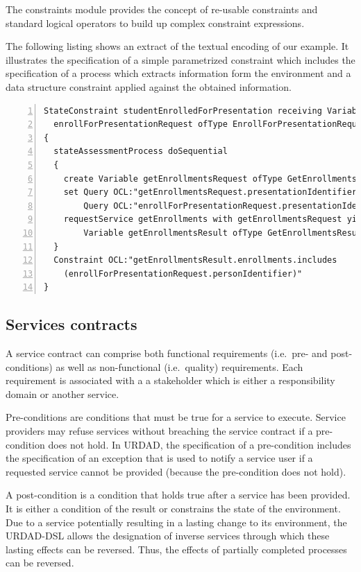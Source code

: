 The constraints module provides the concept of re-usable constraints and standard logical operators to build up complex constraint expressions.

The following listing shows an extract of the textual encoding of our example. It illustrates the specification of a simple parametrized  constraint which includes the specification of a process which extracts information form the environment and a data structure constraint applied against the obtained information.
\tiny \begin{lstlisting}[numbers=left,escapechar=|]
StateConstraint studentEnrolledForPresentation receiving Variable 
  enrollForPresentationRequest ofType EnrollForPresentationRequest
{
  stateAssessmentProcess doSequential
  {
    create Variable getEnrollmentsRequest ofType GetEnrollmentsRequest
    set Query OCL:"getEnrollmentsRequest.presentationIdentifier" equalTo
        Query OCL:"enrollForPresentationRequest.presentationIdentifier"
    requestService getEnrollments with getEnrollmentsRequest yielding
        Variable getEnrollmentsResult ofType GetEnrollmentsResult
  }
  Constraint OCL:"getEnrollmentsResult.enrollments.includes
    (enrollForPresentationRequest.personIdentifier)"
}
\end{lstlisting}\normalsize


\subsection{Services contracts}

A service contract can comprise both functional requirements (i.e.\ pre- and post-conditions) as well as non-functional (i.e.\ quality) requirements. Each requirement is associated with a a stakeholder which is either a responsibility domain or another service. 

Pre-conditions are conditions that must be true for a service to execute. Service providers may refuse  services without breaching the service contract if a pre-condition does not hold. In URDAD, the specification of a pre-condition includes the specification of an exception that is used to notify a service user if a requested service cannot be provided (because the pre-condition does not hold). 

A post-condition is a condition that holds true after a service has been provided. It is either a condition of the result or constrains the state of the environment. Due to a service potentially resulting in a lasting change to its environment, the URDAD-DSL allows the designation of inverse services through which these lasting effects can be reversed. Thus, the effects of partially completed processes can be reversed.

